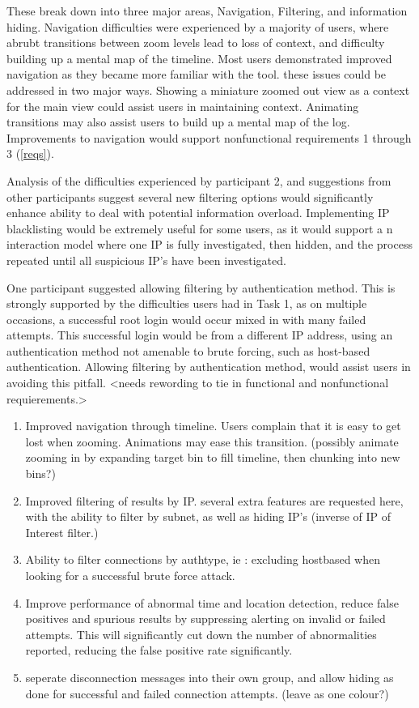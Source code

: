 These break down into three major areas, Navigation, Filtering, and information hiding.
Navigation difficulties were experienced by a majority of users, where abrubt transitions between zoom levels lead to loss of context, and difficulty building up a mental map of the timeline. 
Most users demonstrated improved navigation as they became more familiar with the tool. these issues could be addressed in two major ways. Showing a miniature zoomed out view as a context for the main view could assist users in maintaining context. 
Animating transitions may also assist users to build up a mental map of the log. Improvements to navigation would support nonfunctional requirements 1 through 3 (\ref{reqs}). 

Analysis of the difficulties experienced by participant 2, and suggestions from other participants suggest several new filtering options would significantly enhance ability to deal with potential information overload. 
Implementing IP blacklisting would be extremely useful for some users, as it would support a n interaction model where one IP is fully investigated, then hidden, and the process repeated until all suspicious IP's have been investigated. 

One participant suggested allowing filtering by authentication method. This is strongly supported by the difficulties users had in Task 1, as on multiple occasions, a successful root login would occur mixed in with many failed attempts. This successful login would be from a different IP address, using an authentication method not amenable to brute forcing, such as host-based authentication. Allowing filtering by authentication method, would assist users in avoiding this pitfall. <needs rewording to tie in functional and nonfunctional requierements.>


\begin{enumerate}
\item{Improved navigation through timeline. Users complain that it is easy to get lost when zooming. Animations may ease this transition. (possibly animate zooming in by expanding target bin to fill timeline, then chunking into new bins?)}
\item{Improved filtering of results by IP. several extra features are requested here, with the ability to filter by subnet, as well as hiding IP's (inverse of IP of Interest filter.)}
\item{Ability to filter connections by authtype, ie : excluding hostbased when looking for a successful brute force attack.}
\item{Improve performance of abnormal time and location detection, reduce false positives and spurious results by suppressing alerting on invalid or failed attempts. This will significantly cut down the number of abnormalities reported, reducing the false positive rate significantly.}
\item{seperate disconnection messages into their own group, and allow hiding as done for successful and failed connection attempts. (leave as one colour?)}
\end{enumerate}

